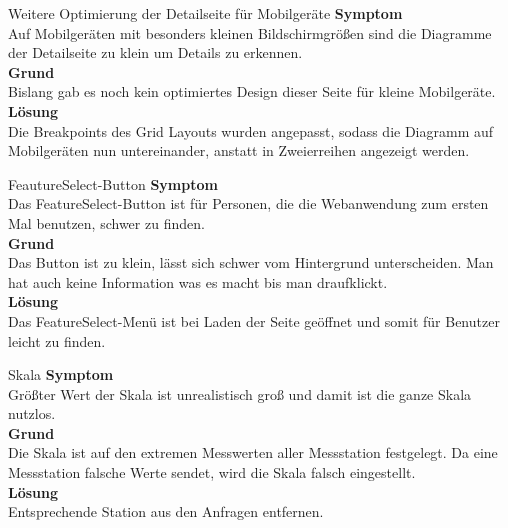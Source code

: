     \begin{Bug}{Weitere Optimierung der Detailseite für Mobilgeräte}
      \textbf{Symptom}\\
      Auf Mobilgeräten mit besonders kleinen Bildschirmgrößen sind die Diagramme der Detailseite zu klein um Details zu erkennen.\\
      \linebreak
      \textbf{Grund}\\
      Bislang gab es noch kein optimiertes Design dieser Seite für kleine Mobilgeräte.\\
      \linebreak
      \textbf{Lösung}\\
      Die Breakpoints des Grid Layouts wurden angepasst, sodass die Diagramm auf Mobilgeräten nun untereinander, anstatt in Zweierreihen angezeigt werden.\\
    \end{Bug}
      
    \begin{Bug}{FeautureSelect-Button}
      \textbf{Symptom}\\
      Das FeatureSelect-Button ist für Personen, die die Webanwendung zum ersten Mal benutzen, schwer zu finden.\\
      \linebreak
      \textbf{Grund}\\
      Das Button ist zu klein, lässt sich schwer vom Hintergrund unterscheiden. Man hat auch keine Information was es macht bis man draufklickt.\\
      \linebreak
      \textbf{Lösung}\\
      Das FeatureSelect-Menü ist bei Laden der Seite geöffnet und somit für Benutzer leicht zu finden.\\
    \end{Bug}

    \begin{Bug}{Skala}
      \textbf{Symptom}\\
      Größter Wert der Skala ist unrealistisch groß und damit ist die ganze Skala nutzlos.\\
      \linebreak
      \textbf{Grund}\\
      Die Skala ist auf den extremen Messwerten aller Messstation festgelegt. Da eine Messstation falsche Werte sendet, wird die Skala falsch eingestellt.\\
      \linebreak
      \textbf{Lösung}\\
      Entsprechende Station aus den Anfragen entfernen.\\
    \end{Bug}
      
